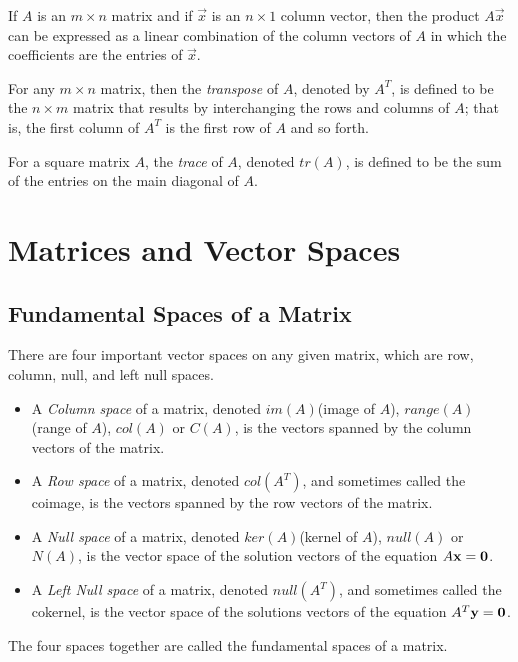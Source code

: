 \documentclass{report}
\begin{document}
			\begin{thm}
				If $A$ is an $m \times n$ matrix and if $\vec{x}$ is an $n \times 1$ column vector, then the product $A\vec{x}$ can be expressed as a linear combination of the column vectors of $A$ in which the coefficients are the entries of $\vec{x}$.
			\end{thm}
			
			\begin{defn}[Transpose]
				For any $m \times n$ matrix, then the \emph{transpose} of $A$, denoted by $A^T$, is defined to be the $n \times m$ matrix that results by interchanging the rows and columns of $A$; that is, the first column of $A^T$ is the first row of $A$ and so forth.
			\end{defn}
			
			\begin{defn}[Trace]
				For a square matrix $A$, the \emph{trace} of $A$, denoted $tr(A)$, is defined to be the sum of the entries on the main diagonal of $A$.
			\end{defn}

	\section{Matrices and Vector Spaces}
	\subsection{Fundamental Spaces of a Matrix}
	There are four important vector spaces on any given matrix, which are row, column, null, and left null spaces.
	\begin{defn}
		\begin{itemize}
			\item A \emph{Column space} of a matrix, denoted $im(A)$(image of $A$), $range(A)$(range of $A$), $col(A)$ or $C(A)$, is the vectors spanned by the column vectors of the matrix.
			\item A \emph{Row space} of a matrix, denoted $col(A^T)$, and sometimes called the coimage, is the vectors spanned by the row vectors of the matrix.
			\item A \emph{Null space} of a matrix, denoted $ker(A)$(kernel of $A$), $null(A)$ or $N(A)$, is the vector space of the solution vectors of the equation $A\bf{x}=\bf{0}$.
			\item A \emph{Left Null space} of a matrix, denoted $null(A^T)$, and sometimes called the cokernel, is the vector space of the solutions vectors of the equation $A^T\bf{y}=\bf{0}$.
		\end{itemize}
		The four spaces together are called the fundamental spaces of a matrix.
	\end{defn}
	
\end{document}

